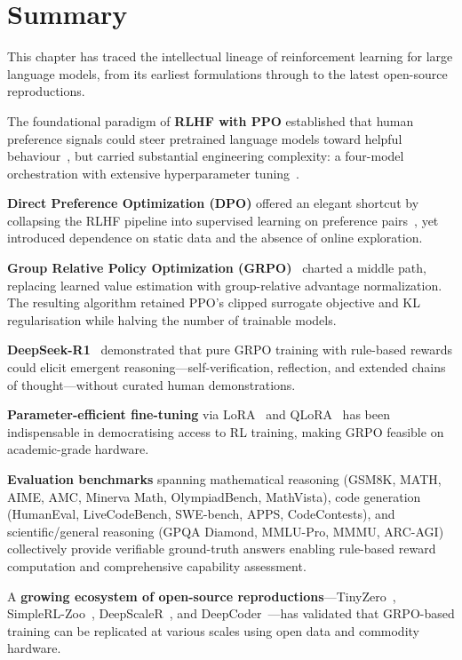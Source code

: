 \documentclass[12pt,a4paper]{report}
\theoremstyle{definition}
\begin{document}
\section{Summary}
\label{sec:lit-summary}

This chapter has traced the intellectual lineage of reinforcement learning for large language models, from its earliest formulations through to the latest open-source reproductions.

The foundational paradigm of \textbf{RLHF with PPO} established that human preference signals could steer pretrained language models toward helpful behaviour~\cite{ouyang2022instructgpt}, but carried substantial engineering complexity: a four-model orchestration with extensive hyperparameter tuning~\cite{schulman2017ppo, zheng2023secrets}.

\textbf{Direct Preference Optimization (DPO)} offered an elegant shortcut by collapsing the RLHF pipeline into supervised learning on preference pairs~\cite{rafailov2023dpo}, yet introduced dependence on static data and the absence of online exploration.

\textbf{Group Relative Policy Optimization (GRPO)}~\cite{shao2024deepseekmath} charted a middle path, replacing learned value estimation with group-relative advantage normalization. The resulting algorithm retained PPO's clipped surrogate objective and KL regularisation while halving the number of trainable models.

\textbf{DeepSeek-R1}~\cite{deepseek2025r1} demonstrated that pure GRPO training with rule-based rewards could elicit emergent reasoning---self-verification, reflection, and extended chains of thought---without curated human demonstrations.

\textbf{Parameter-efficient fine-tuning} via LoRA~\cite{hu2021lora} and QLoRA~\cite{dettmers2023qlora} has been indispensable in democratising access to RL training, making GRPO feasible on academic-grade hardware.

\textbf{Evaluation benchmarks} spanning mathematical reasoning (GSM8K, MATH, AIME, AMC, Minerva Math, OlympiadBench, MathVista), code generation (HumanEval, LiveCodeBench, SWE-bench, APPS, CodeContests), and scientific/general reasoning (GPQA Diamond, MMLU-Pro, MMMU, ARC-AGI) collectively provide verifiable ground-truth answers enabling rule-based reward computation and comprehensive capability assessment.

A \textbf{growing ecosystem of open-source reproductions}---TinyZero~\cite{wen2025tinyzero}, SimpleRL-Zoo~\cite{zeng2025simplerl}, DeepScaleR~\cite{luo2025deepscaler}, and DeepCoder~\cite{xu2025deepcoder}---has validated that GRPO-based training can be replicated at various scales using open data and commodity hardware.
\end{document}
